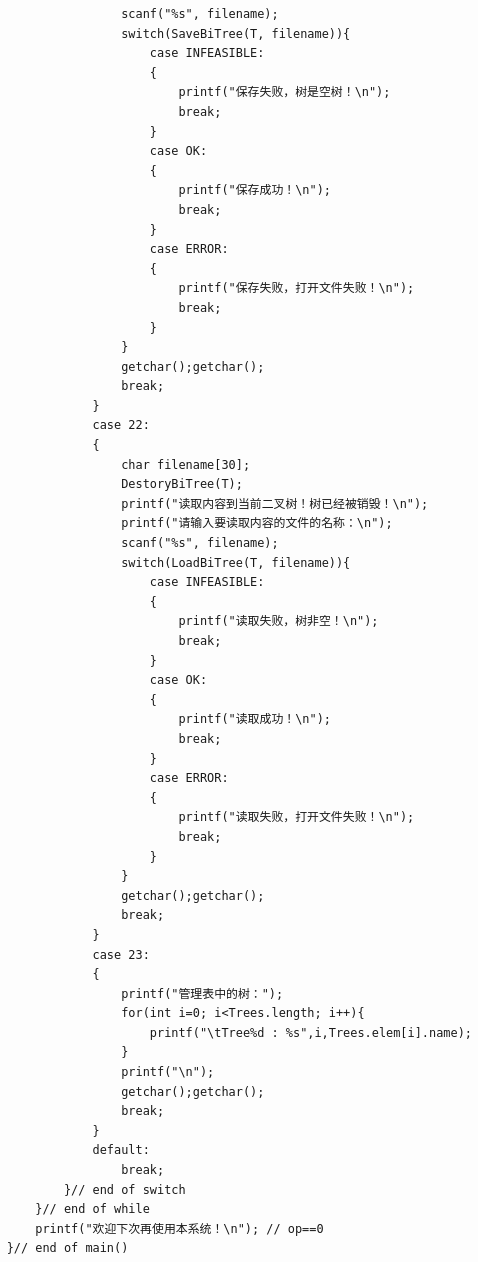 \documentclass[supercite]{Experimental_Report}
\theoremstyle{definition}
\begin{document}
\begin{lstlisting}
					scanf("%s", filename);
					switch(SaveBiTree(T, filename)){
						case INFEASIBLE:
						{
							printf("保存失败，树是空树！\n");
							break;
						}
						case OK:
						{
							printf("保存成功！\n");
							break;
						}
						case ERROR:
						{
							printf("保存失败，打开文件失败！\n");
							break;
						}
					}
					getchar();getchar();
					break;
				}
				case 22:
				{
					char filename[30];
					DestoryBiTree(T);
					printf("读取内容到当前二叉树！树已经被销毁！\n");
					printf("请输入要读取内容的文件的名称：\n");
					scanf("%s", filename);
					switch(LoadBiTree(T, filename)){
						case INFEASIBLE:
						{
							printf("读取失败，树非空！\n");
							break;
						}
						case OK:
						{
							printf("读取成功！\n");
							break;
						}
						case ERROR:
						{
							printf("读取失败，打开文件失败！\n");
							break;
						}
					}
					getchar();getchar();
					break;
				}
				case 23:
				{
					printf("管理表中的树：");
					for(int i=0; i<Trees.length; i++){
						printf("\tTree%d : %s",i,Trees.elem[i].name);
					}
					printf("\n");
					getchar();getchar();
					break;
				}
				default:
					break;
			}// end of switch
		}// end of while
		printf("欢迎下次再使用本系统！\n"); // op==0
	}// end of main()
	
\end{lstlisting}
\end{document}
